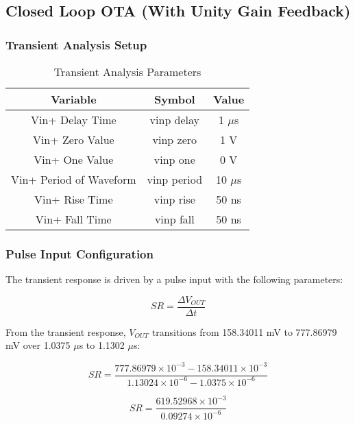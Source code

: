 \subsection{Closed Loop OTA (With Unity Gain Feedback)}

\subsubsection{Transient Analysis Setup}

\begin{table}[h]
    \centering
    \caption{Transient Analysis Parameters}
    \begin{tabular}{|c|c|c|}
        \hline
        \textbf{Variable} & \textbf{Symbol} & \textbf{Value} \\
        \hline
        Vin+ Delay Time & vinp delay & 1 $\mu$s \\
        Vin+ Zero Value & vinp zero & 1 V \\
        Vin+ One Value & vinp one & 0 V \\
        Vin+ Period of Waveform & vinp period & 10 $\mu$s \\
        Vin+ Rise Time & vinp rise & 50 ns \\
        Vin+ Fall Time & vinp fall & 50 ns \\
        \hline
    \end{tabular}
\end{table}

\subsubsection{Pulse Input Configuration}
The transient response is driven by a pulse input with the following parameters:

\begin{equation}
    SR = \frac{\Delta V_{OUT}}{\Delta t}
\end{equation}

From the transient response, $V_{OUT}$ transitions from 158.34011 mV to 777.86979 mV over 1.0375 $\mu$s to 1.1302 $\mu$s:

\begin{equation}
    SR = \frac{777.86979 \times 10^{-3} - 158.34011 \times 10^{-3}}{1.13024 \times 10^{-6} - 1.0375 \times 10^{-6}}
\end{equation}

\begin{equation}
    SR = \frac{619.52968 \times 10^{-3}}{0.09274 \times 10^{-6}}
\end{equation}


